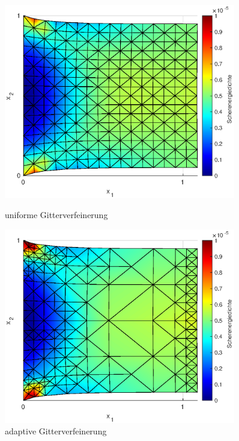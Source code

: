 \documentclass{scrartcl}
\begin{document}
\begin{figure}[h]
\centering
\begin{minipage}{0.475\textwidth}
\centering
\includegraphics[width=0.9\textwidth]{Plots/PullBoxUniformDeform3}
\caption{uniforme Gitterverfeinerung}
\label{pl:PullBoxUniformSoln}
\end{minipage}
\hfill
\begin{minipage}{0.475\textwidth}
\centering
\includegraphics[width=0.9\textwidth]{Plots/PullBoxAdaptiveDeform3}
\caption{adaptive Gitterverfeinerung}
\label{pl:PullBoxAdaptiveSoln}
\end{minipage}
\end{figure}
\end{document}
